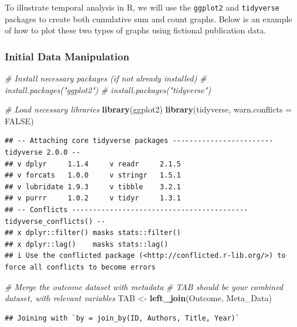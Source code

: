 \documentclass[
]{book}
\newenvironment{Shaded}{\begin{snugshade}}{\end{snugshade}}
\newcommand{\AttributeTok}[1]{\textcolor[rgb]{0.13,0.29,0.53}{#1}}
\newcommand{\CommentTok}[1]{\textcolor[rgb]{0.56,0.35,0.01}{\textit{#1}}}
\newcommand{\ConstantTok}[1]{\textcolor[rgb]{0.56,0.35,0.01}{#1}}
\newcommand{\FunctionTok}[1]{\textcolor[rgb]{0.13,0.29,0.53}{\textbf{#1}}}
\newcommand{\NormalTok}[1]{#1}
\newcommand{\OtherTok}[1]{\textcolor[rgb]{0.56,0.35,0.01}{#1}}
\begin{document}
To illustrate temporal analysis in R, we will use the \texttt{ggplot2} and \texttt{tidyverse} packages to create both cumulative sum and count graphs.
Below is an example of how to plot these two types of graphs using fictional publication data.

\subsubsection{Initial Data Manipulation}\label{initial-data-manipulation}

\begin{Shaded}
\begin{Highlighting}[]
\CommentTok{\# Install necessary packages (if not already installed)}
\CommentTok{\# install.packages("ggplot2")}
\CommentTok{\# install.packages("tidyverse")}

\CommentTok{\# Load necessary libraries}
\FunctionTok{library}\NormalTok{(ggplot2)}
\FunctionTok{library}\NormalTok{(tidyverse, }\AttributeTok{warn.conflicts =} \ConstantTok{FALSE}\NormalTok{)}
\end{Highlighting}
\end{Shaded}

\begin{verbatim}
## -- Attaching core tidyverse packages ------------------------ tidyverse 2.0.0 --
## v dplyr     1.1.4     v readr     2.1.5
## v forcats   1.0.0     v stringr   1.5.1
## v lubridate 1.9.3     v tibble    3.2.1
## v purrr     1.0.2     v tidyr     1.3.1
## -- Conflicts ------------------------------------------ tidyverse_conflicts() --
## x dplyr::filter() masks stats::filter()
## x dplyr::lag()    masks stats::lag()
## i Use the conflicted package (<http://conflicted.r-lib.org/>) to force all conflicts to become errors
\end{verbatim}

\begin{Shaded}
\begin{Highlighting}[]
\CommentTok{\# Merge the outcome dataset with metadata}
\CommentTok{\# TAB should be your combined dataset, with relevant variables}
\NormalTok{TAB }\OtherTok{\textless{}{-}} \FunctionTok{left\_join}\NormalTok{(Outcome, Meta\_Data)}
\end{Highlighting}
\end{Shaded}

\begin{verbatim}
## Joining with `by = join_by(ID, Authors, Title, Year)`
\end{verbatim}
\end{document}
